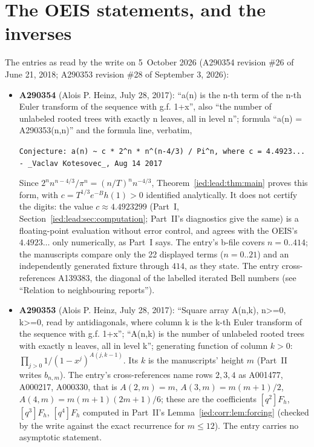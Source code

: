 \documentclass[11pt,letterpaper]{article}
\theoremstyle{remark}\newtheorem{remark}[theorem]{Remark}
\begin{document}
\section*{The OEIS statements, and the inverses}\label{ied:sec:oeis}
The entries as read by the write on 5~October 2026 (A290354 revision \#26 of June 21, 2018; A290353 revision \#28 of September 3, 2026):
\begin{itemize}
\item \textbf{A290354} (Alois P. Heinz, July 28, 2017): ``a(n) is the n-th term of the n-th Euler transform of the sequence with g.f. 1+x'', also ``the number of unlabeled rooted trees with exactly n leaves, all in level n''; formula ``a(n) = A290353(n,n)'' and the formula line, verbatim,
\begin{center}\small\texttt{Conjecture: a(n) \textasciitilde{} c * 2\textasciicircum{}n * n\textasciicircum{}(n-4/3) / Pi\textasciicircum{}n, where c = 4.4923... - \_Vaclav Kotesovec\_, Aug 14 2017}\end{center}
Since $2^nn^{n-4/3}/\pi^n=(n/T)^nn^{-4/3}$, Theorem~\ref{ied:lead:thm:main} proves this form, with $c=T^{1/3}e^{-B}h(1)>0$ identified analytically. It does not certify the digits: the value $c\approx4.4923299$ (Part~I, Section~\ref{ied:lead:sec:computation}; Part~II's diagnostics give the same) is a floating-point evaluation without error control, and agrees with the OEIS's $4.4923\ldots$ only numerically, as Part~I says. The entry's b-file covers $n=0..414$; the manuscripts compare only the 22 displayed terms ($n=0..21$) and an independently generated fixture through $414$, as they state. The entry cross-references A139383, the diagonal of the labelled iterated Bell numbers (see ``Relation to neighbouring reports'').
\item \textbf{A290353} (Alois P. Heinz, July 28, 2017): ``Square array A(n,k), n>=0, k>=0, read by antidiagonals, where column k is the k-th Euler transform of the sequence with g.f. 1+x''; ``A(n,k) is the number of unlabeled rooted trees with exactly n leaves, all in level k''; generating function of column $k>0$: $\prod_{j>0}1/(1-x^j)^{A(j,k-1)}$. Its $k$ is the manuscripts' height $m$ (Part~II writes $b_{n,m}$). The entry's cross-references name rows $2,3,4$ as A001477, A000217, A000330, that is $A(2,m)=m$, $A(3,m)=m(m+1)/2$, $A(4,m)=m(m+1)(2m+1)/6$; these are the coefficients $[q^2]F_h$, $[q^3]F_h$, $[q^4]F_h$ computed in Part~II's Lemma~\ref{ied:corr:lem:forcing} (checked by the write against the exact recurrence for $m\le12$). The entry carries no asymptotic statement.
\end{itemize}
\end{document}
